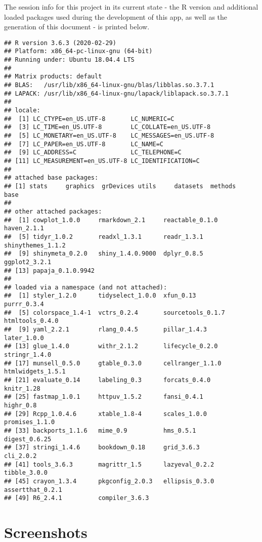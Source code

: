 \documentclass[english,man,floatsintext]{apa6}
\begin{document}
The session info for this project in its current state - the R version and additional loaded packages used during the development of this app, as well as the generation of this document - is printed below.

\begin{verbatim}
## R version 3.6.3 (2020-02-29)
## Platform: x86_64-pc-linux-gnu (64-bit)
## Running under: Ubuntu 18.04.4 LTS
## 
## Matrix products: default
## BLAS:   /usr/lib/x86_64-linux-gnu/blas/libblas.so.3.7.1
## LAPACK: /usr/lib/x86_64-linux-gnu/lapack/liblapack.so.3.7.1
## 
## locale:
##  [1] LC_CTYPE=en_US.UTF-8       LC_NUMERIC=C              
##  [3] LC_TIME=en_US.UTF-8        LC_COLLATE=en_US.UTF-8    
##  [5] LC_MONETARY=en_US.UTF-8    LC_MESSAGES=en_US.UTF-8   
##  [7] LC_PAPER=en_US.UTF-8       LC_NAME=C                 
##  [9] LC_ADDRESS=C               LC_TELEPHONE=C            
## [11] LC_MEASUREMENT=en_US.UTF-8 LC_IDENTIFICATION=C       
## 
## attached base packages:
## [1] stats     graphics  grDevices utils     datasets  methods   base     
## 
## other attached packages:
##  [1] cowplot_1.0.0     rmarkdown_2.1     reactable_0.1.0   haven_2.1.1      
##  [5] tidyr_1.0.2       readxl_1.3.1      readr_1.3.1       shinythemes_1.1.2
##  [9] shinymeta_0.2.0   shiny_1.4.0.9000  dplyr_0.8.5       ggplot2_3.2.1    
## [13] papaja_0.1.0.9942
## 
## loaded via a namespace (and not attached):
##  [1] styler_1.2.0      tidyselect_1.0.0  xfun_0.13         purrr_0.3.4      
##  [5] colorspace_1.4-1  vctrs_0.2.4       sourcetools_0.1.7 htmltools_0.4.0  
##  [9] yaml_2.2.1        rlang_0.4.5       pillar_1.4.3      later_1.0.0      
## [13] glue_1.4.0        withr_2.1.2       lifecycle_0.2.0   stringr_1.4.0    
## [17] munsell_0.5.0     gtable_0.3.0      cellranger_1.1.0  htmlwidgets_1.5.1
## [21] evaluate_0.14     labeling_0.3      forcats_0.4.0     knitr_1.28       
## [25] fastmap_1.0.1     httpuv_1.5.2      fansi_0.4.1       highr_0.8        
## [29] Rcpp_1.0.4.6      xtable_1.8-4      scales_1.0.0      promises_1.1.0   
## [33] backports_1.1.6   mime_0.9          hms_0.5.1         digest_0.6.25    
## [37] stringi_1.4.6     bookdown_0.18     grid_3.6.3        cli_2.0.2        
## [41] tools_3.6.3       magrittr_1.5      lazyeval_0.2.2    tibble_3.0.0     
## [45] crayon_1.3.4      pkgconfig_2.0.3   ellipsis_0.3.0    assertthat_0.2.1 
## [49] R6_2.4.1          compiler_3.6.3
\end{verbatim}

\newpage

\hypertarget{screenshots}{%
\section{Screenshots}\label{screenshots}}
\end{document}
